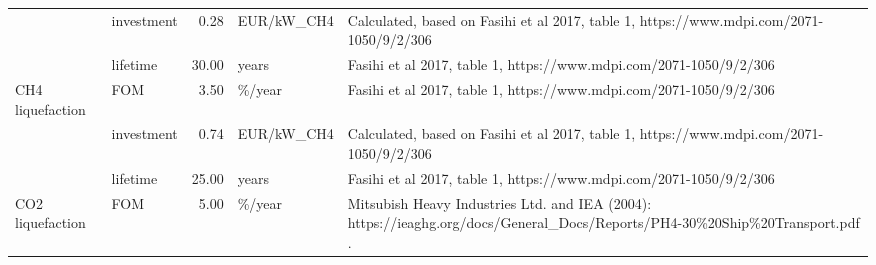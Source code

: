 \begin{longtable}{p{5cm}p{3cm}rp{3cm}p{11cm}}
                      & investment &           0.28 &                        EUR/kW\_CH4 &                                                                                                                                                                                                                                              Calculated, based on Fasihi et al 2017, table 1, https://www.mdpi.com/2071-1050/9/2/306 \\
                      & lifetime &          30.00 &                             years &                                                                                                                                                                                                                                                                   Fasihi et al 2017, table 1, https://www.mdpi.com/2071-1050/9/2/306 \\
CH4 liquefaction & FOM &           3.50 &                            \%/year &                                                                                                                                                                                                                                                                   Fasihi et al 2017, table 1, https://www.mdpi.com/2071-1050/9/2/306 \\
                      & investment &           0.74 &                        EUR/kW\_CH4 &                                                                                                                                                                                                                                              Calculated, based on Fasihi et al 2017, table 1, https://www.mdpi.com/2071-1050/9/2/306 \\
                      & lifetime &          25.00 &                             years &                                                                                                                                                                                                                                                                   Fasihi et al 2017, table 1, https://www.mdpi.com/2071-1050/9/2/306 \\
CO2 liquefaction & FOM &           5.00 &                            \%/year &                                                                                                                                                                                                         Mitsubish Heavy Industries Ltd. and IEA (2004): https://ieaghg.org/docs/General\_Docs/Reports/PH4-30\%20Ship\%20Transport.pdf . \\

\end{longtable}
